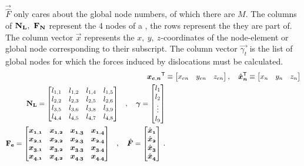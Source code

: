 $ \vec{\hat{F}} $ only cares about the global node numbers, of which there are $ M $. The columns of $ \mathbf{N_{L}},~ \mathbf{F_{N}} $ represent the 4 nodes of a , the rows represent the  they are part of. The column vector $ \vec{x} $ represents the $ x,~y,~z$-coordinates of the node-element or global node corresponding to their subscript. The column vector $ \vec{\gamma_{t}} $ is the list of global nodes for which the forces induced by dislocations must be calculated.
\begin{align}
	\vec{x_{e,n}}^{\mathsf{T}} & \equiv	\begin{bmatrix}
		x_{en} & y_{en} & z_{en}
	\end{bmatrix}, \quad
	\vec{\hat{x}_{n}}^{\mathsf{T}} \equiv	\begin{bmatrix}
		x_{n} & y_{n} & z_{n}
	\end{bmatrix}      \\
	\begin{split}
		\mtx{N_{L}} &=	\begin{bmatrix}
			l_{1,1} & l_{1,2} & l_{1,4} & l_{1,5} \\
			l_{2,2} & l_{2,3} & l_{2,5} & l_{2,6} \\
			l_{3,5} & l_{3,6} & l_{3,8} & l_{3,9} \\
			l_{4,4} & l_{4,5} & l_{4,7} & l_{4,8} \\
		\end{bmatrix}
	\end{split}
	, \quad
	\vec{\gamma} =   \begin{bmatrix}
		l_1    \\
		l_2    \\
		\vdots \\
		l_9
	\end{bmatrix}                          \\
	\begin{split}
		\mtx{F_{e}} &=	\begin{bmatrix}
			\vec{x_{1,1}} & \vec{x_{1,2}} & \vec{x_{1,3}} & \vec{x_{1,4}} \\
			\vec{x_{2,1}} & \vec{x_{2,2}} & \vec{x_{2,3}} & \vec{x_{2,4}} \\
			\vec{x_{3,1}} & \vec{x_{3,2}} & \vec{x_{3,3}} & \vec{x_{3,4}} \\
			\vec{x_{4,1}} & \vec{x_{4,2}} & \vec{x_{4,3}} & \vec{x_{4,4}} \\
		\end{bmatrix}
	\end{split}
	,\quad
	\vec{\hat{F}} = 	\begin{bmatrix}
		\vec{\hat{x}_{1}} \\
		\vec{\hat{x}_{2}} \\
		\vec{\hat{x}_{3}} \\
		\vec{\hat{x}_{4}}
	\end{bmatrix}\,.\label{e:force_imp}
\end{align}


